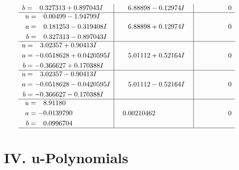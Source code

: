 \documentclass[1p]{elsarticle_modified}
\theoremstyle{definition}
\begin{document}
$$\begin{array}{c|c|c}
\begin{aligned}
b &= \phantom{-}0.327313 + 0.897043 I\end{aligned}
 & \phantom{-}6.88898 - 0.12974 I & \phantom{-0.000000 } 0 \\ \hline\begin{aligned}
u &= \phantom{-}0.00499 - 1.94799 I \\
a &= \phantom{-}0.181253 - 0.319408 I \\
b &= \phantom{-}0.327313 - 0.897043 I\end{aligned}
 & \phantom{-}6.88898 + 0.12974 I & \phantom{-0.000000 } 0 \\ \hline\begin{aligned}
u &= \phantom{-}3.02357 + 0.90413 I \\
a &= -0.0518628 + 0.0420595 I \\
b &= -0.366627 + 0.170388 I\end{aligned}
 & \phantom{-}5.01112 + 0.52164 I & \phantom{-0.000000 } 0 \\ \hline\begin{aligned}
u &= \phantom{-}3.02357 - 0.90413 I \\
a &= -0.0518628 - 0.0420595 I \\
b &= -0.366627 - 0.170388 I\end{aligned}
 & \phantom{-}5.01112 - 0.52164 I & \phantom{-0.000000 } 0 \\ \hline\begin{aligned}
u &= \phantom{-}8.91180\phantom{ +0.000000I} \\
a &= -0.0139790\phantom{ +0.000000I} \\
b &= \phantom{-}0.0996704\phantom{ +0.000000I}\end{aligned}
 & \phantom{-}0.00210462\phantom{ +0.000000I} & \phantom{-0.000000 } 0\\
 \hline 
 \end{array}$$\newpage
\newpage\renewcommand{\arraystretch}{1}
\centering \section*{ IV. u-Polynomials}
\end{document}

